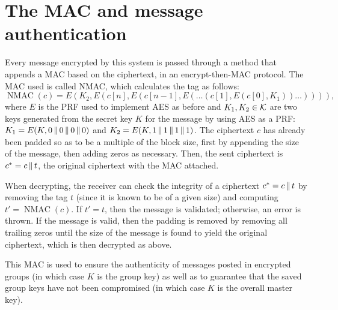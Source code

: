 \documentclass{amsart}
\begin{document}
\section{The MAC and message authentication}
Every message encrypted by this system is passed through a method that appends a MAC based on the ciphertext, in an encrypt-then-MAC protocol. The MAC used is called NMAC, which calculates the tag as follows:
\[\operatorname{NMAC}(c) = E(K_2,E(c[n],E(c[n-1],E(\dots(c[1],E(c[0],K_1))\dots)))),\]
where $E$ is the PRF used to implement AES as before and $K_1,K_2\in\mathcal K$ are two keys generated from the secret key $K$ for the message by using AES as a PRF: $K_1 = E(K,0\operatorname{\|} 0\operatorname{\|} 0\operatorname{\|} 0)$ and $K_2 = E(K,1\operatorname{\|} 1\operatorname{\|} 1\operatorname{\|} 1)$. The ciphertext $c$ has already been padded so as to be a multiple of the block size, first by appending the size of the message, then adding zeros as necessary. Then, the sent ciphertext is $c^* = c\operatorname{\|} t$, the original ciphertext with the MAC attached.

When decrypting, the receiver can check the integrity of a ciphertext $c^* = c\operatorname{\|} t$ by removing the tag $t$ (since it is known to be of a given size) and computing $t' = \operatorname{NMAC}(c)$. If $t' = t$, then the message is validated; otherwise, an error is thrown. If the message is valid, then the padding is removed by removing all trailing zeros until the size of the message is found to yield the original ciphertext, which is then decrypted as above.

This MAC is used to ensure the authenticity of messages posted in encrypted groups (in which case $K$ is the group key) as well as to guarantee that the saved group keys have not been compromised (in which case $K$ is the overall master key).
\end{document}

